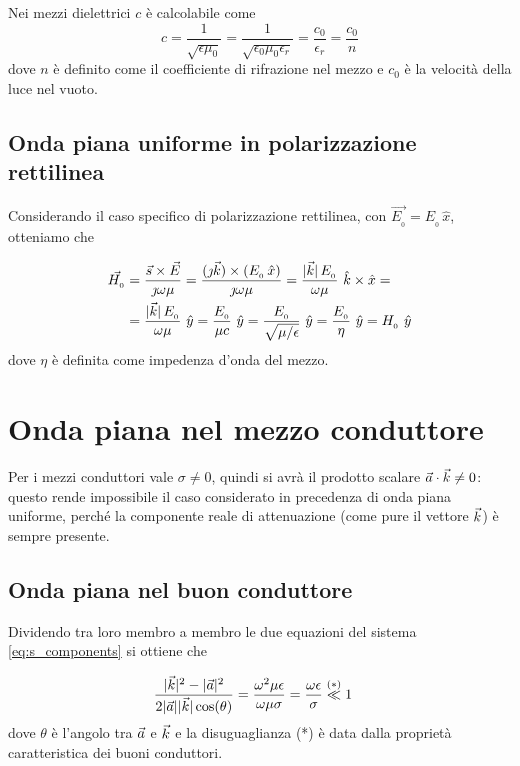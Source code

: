 		Nei mezzi dielettrici $c$ è calcolabile come
		\begin{equation*}
				c = \frac{1}{\sqrt{\epsilon \mu_0}} = \frac{1}{\sqrt{\epsilon_0 \mu_0 \epsilon_r}} = \frac{c_0}{\epsilon_r} = \frac{c_0}{n}
		\end{equation*}
		dove $n$ è definito come il coefficiente di rifrazione nel mezzo e $c_0$ è la velocità della luce nel vuoto.

	\subsection{Onda piana uniforme in polarizzazione rettilinea}
		Considerando il caso specifico di polarizzazione rettilinea, con $\vec{E_{_{0}}} = E_{_{0}} \, \hat{x}$, otteniamo che

		\begin{equation*} \begin{split}
			\vec{H_{_{0}}} &= \frac{\vec{s} \times \vec{E}} {\jmath \omega \mu}
				= \frac{(\jmath \vec{k}) \times (E_{_{0}} \, \hat{x})}{\jmath \omega \mu}
				= \frac{|\vec{k}| \, E_{_{0}}}{\omega \mu} ~ \hat{k} \times \hat{x} = \\
			& = \frac{|\vec{k}| \, E_{_{0}}}{\omega \mu} ~ \hat{y}
				= \frac{E_{_{0}}}{\mu c} ~ \hat{y}
				= \frac{E_{_{0}}}{\sqrt{\mu / \epsilon}} ~ \hat{y}
				= \frac{E_{_{0}}}{\eta} ~ \hat{y}
				= H_{_{0}} ~ \hat{y}
		\end{split} \end{equation*}
		dove $\eta$ è definita come impedenza d'onda del mezzo.

\section{Onda piana nel mezzo conduttore}
	Per i mezzi conduttori vale $\sigma \neq 0$, quindi si avrà il prodotto scalare $\vec{a} \cdot \vec{k} \neq 0$: questo rende impossibile il caso considerato in precedenza di onda piana uniforme, perché la componente reale di attenuazione (come pure il vettore $\vec{k}$) è sempre presente.

	\subsection{Onda piana nel buon conduttore} \label{sec:onda_piana_conduttore}
		Dividendo tra loro membro a membro le due equazioni del sistema \ref{eq:s_components} si ottiene che

		\begin{equation*} \begin{split}
			& \frac{|\vec{k}|^2 - |\vec{a}|^2}{2 |\vec{a}| |\vec{k}| \cos(\theta)}
				= \frac{\omega^2 \mu \epsilon}{\omega \mu \sigma}
				= \frac{\omega \epsilon}{\sigma} \stackrel{(*)}{\ll} 1
		\end{split} \end{equation*}
		dove $\theta$ è l'angolo tra $\vec{a}$ e $\vec{k}$ e la disuguaglianza (*) è data dalla proprietà caratteristica dei buoni conduttori.

